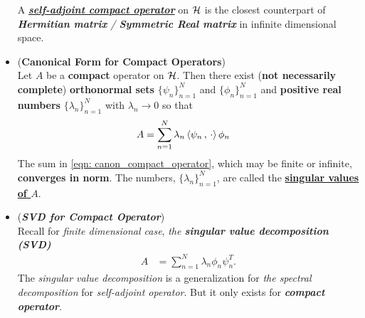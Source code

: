 \documentclass[11pt]{article}
\begin{document}
\begin{itemize}
\begin{remark}
A \underline{\textbf{\emph{self-adjoint compact operator}}} on ${\mathcal H}$ is the closest counterpart of \emph{\textbf{Hermitian matrix} / \textbf{Symmetric Real matrix}} in infinite dimensional space.
\end{remark}

\item \begin{theorem}(\textbf{Canonical Form for Compact Operators})   \citep{reed1980methods}\\
Let $A$ be a \textbf{compact} operator on ${\mathcal H}$. Then there exist (\textbf{not necessarily complete}) \textbf{orthonormal sets} $\{\psi_n\}_{n=1}^{N}$ and $\{\phi_n\}_{n=1}^{N}$ and \textbf{positive real numbers} $\{\lambda_n\}_{n=1}^{N}$ with $\lambda_n \rightarrow 0$ so that 
\begin{align}
A &= \sum_{n=1}^{N}\lambda_n\left\langle \psi_n\,,\, \cdot \right\rangle\phi_n \label{eqn: canon_compact_operator}
\end{align}
The sum in \eqref{eqn: canon_compact_operator}, which may be finite or infinite, \textbf{converges in norm}. The numbers, $\{\lambda_n\}_{n=1}^{N}$, are called the \underline{\textbf{singular values of $A$}}. 
\end{theorem}

\item \begin{remark} (\emph{\textbf{SVD for Compact Operator}})\\
Recall for \emph{finite dimensional case}, \emph{the \textbf{singular value decomposition (SVD)}}
\begin{align*}
A &= \sum_{n=1}^{N}\lambda_n\phi_n \psi_n^{T}.
\end{align*} The \emph{singular value decomposition} is a generalization for \emph{the spectral decomposition} for \emph{self-adjoint operator}. But it only exists for \emph{\textbf{compact operator}}.
\end{remark}
\end{itemize}
\end{document}
